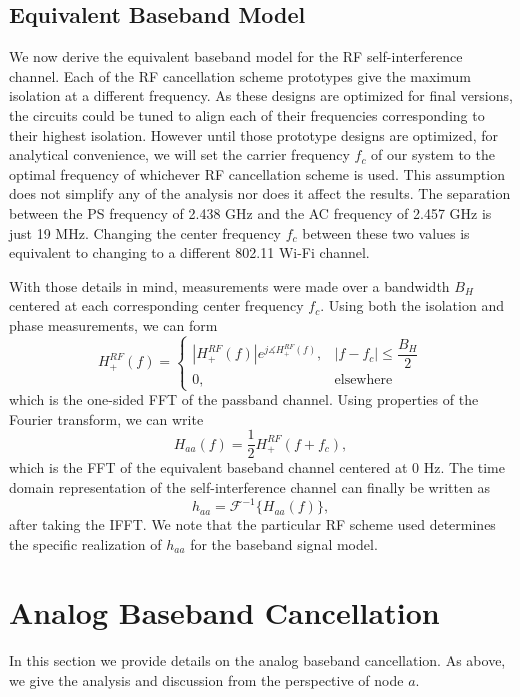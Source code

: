 \documentclass[12pt, journal,draftcls,letterpaper,onecolumn]{IEEEtran}
\begin{document}
\subsection{Equivalent Baseband Model}
We now derive the equivalent baseband model for the RF self-interference channel.  Each of the RF cancellation scheme prototypes give the maximum isolation at a different frequency.  As these designs are optimized for final versions, the circuits could be tuned to align each of their frequencies corresponding to their highest isolation.  However until those prototype designs are optimized, for analytical convenience, we will set the carrier frequency $f_c$ of our system to the optimal frequency of whichever RF cancellation scheme is used.  This assumption does not simplify any of the analysis nor does it affect the results.  The separation between the PS frequency of 2.438 GHz and the AC frequency of 2.457 GHz is just 19 MHz.  Changing the center frequency $f_c$ between these two values is equivalent to changing to a different 802.11 Wi-Fi channel.  

With those details in mind, measurements were made over a bandwidth $B_H$ centered at each corresponding center frequency $f_c$.  Using both the isolation and phase measurements, we can form
\begin{equation}
H^{RF}_{+}(f) =
\left\{ \begin{array}{cl}
|H^{RF}_{+}(f)|e^{j\measuredangle H^{RF}_{+}(f)},  & |f - f_c| \leq \dfrac{B_H}{2}\\
0, & \textrm{elsewhere}
\end{array}\right.
\end{equation}
which is the one-sided FFT of the passband channel.  Using properties of the Fourier transform, we can write
\begin{equation}
H_{aa}(f) = \dfrac{1}{2}H^{RF}_{+}(f+f_c),
\label{eq:H_si_f}
\end{equation}
which is the FFT of the equivalent baseband channel centered at 0 Hz.  The time domain representation of the self-interference channel can finally be written as
\begin{equation}
h_{aa} = \mathcal{F}^{-1}\{H_{aa}(f) \},
\label{eq:h_si}
\end{equation}
after taking the IFFT.  We note that the particular RF scheme used determines the specific realization of $h_{aa}$ for the baseband signal model.  


\section{Analog Baseband Cancellation}
\label{sec:self_int_canc}
In this section we provide details on the analog baseband cancellation.  As above, we give the analysis and discussion from the perspective of node $a$.  
\end{document}
